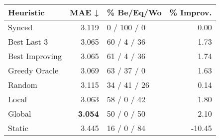 \begin{tabular}{lrlr}
\toprule
\textbf{Heuristic} & \textbf{MAE ↓} & \textbf{\% Be/Eq/Wo} & \textbf{\% Improv.} \\
\midrule
            Synced &          3.119 &          0 / 100 / 0 &                0.00 \\
\midrule
       Best Last 3 &          3.065 &          60 / 4 / 36 &                1.73 \\
    Best Improving &          3.065 &          61 / 4 / 36 &                1.74 \\
\addlinespace
     Greedy Oracle &          3.069 &          63 / 37 / 0 &                1.63 \\
            Random &          3.115 &         34 / 41 / 26 &                0.14 \\
\midrule
             Local &          \underline{3.063} &          58 / 0 / 42 &                1.80 \\
            Global &          \textbf{3.054} &          50 / 0 / 50 &                2.10 \\
\midrule
            Static &          3.445 &          16 / 0 / 84 &              -10.45 \\
\bottomrule
\end{tabular}

\label{tab:ds_non_lr01_le1_bs4_Summary}
